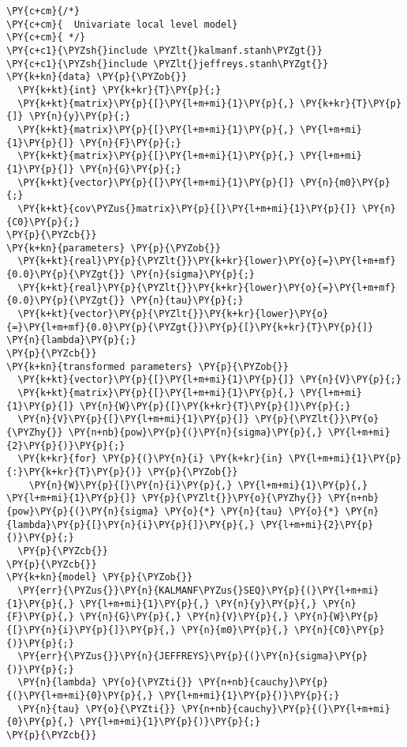 \begin{Verbatim}[commandchars=\\\{\}]
\PY{c+cm}{/*}
\PY{c+cm}{  Univariate local level model}
\PY{c+cm}{ */}
\PY{c+c1}{\PYZsh{}include \PYZlt{}kalmanf.stanh\PYZgt{}}
\PY{c+c1}{\PYZsh{}include \PYZlt{}jeffreys.stanh\PYZgt{}}
\PY{k+kn}{data} \PY{p}{\PYZob{}}
  \PY{k+kt}{int} \PY{k+kr}{T}\PY{p}{;}
  \PY{k+kt}{matrix}\PY{p}{[}\PY{l+m+mi}{1}\PY{p}{,} \PY{k+kr}{T}\PY{p}{]} \PY{n}{y}\PY{p}{;}
  \PY{k+kt}{matrix}\PY{p}{[}\PY{l+m+mi}{1}\PY{p}{,} \PY{l+m+mi}{1}\PY{p}{]} \PY{n}{F}\PY{p}{;}
  \PY{k+kt}{matrix}\PY{p}{[}\PY{l+m+mi}{1}\PY{p}{,} \PY{l+m+mi}{1}\PY{p}{]} \PY{n}{G}\PY{p}{;}
  \PY{k+kt}{vector}\PY{p}{[}\PY{l+m+mi}{1}\PY{p}{]} \PY{n}{m0}\PY{p}{;}
  \PY{k+kt}{cov\PYZus{}matrix}\PY{p}{[}\PY{l+m+mi}{1}\PY{p}{]} \PY{n}{C0}\PY{p}{;}
\PY{p}{\PYZcb{}}
\PY{k+kn}{parameters} \PY{p}{\PYZob{}}
  \PY{k+kt}{real}\PY{p}{\PYZlt{}}\PY{k+kr}{lower}\PY{o}{=}\PY{l+m+mf}{0.0}\PY{p}{\PYZgt{}} \PY{n}{sigma}\PY{p}{;}
  \PY{k+kt}{real}\PY{p}{\PYZlt{}}\PY{k+kr}{lower}\PY{o}{=}\PY{l+m+mf}{0.0}\PY{p}{\PYZgt{}} \PY{n}{tau}\PY{p}{;}
  \PY{k+kt}{vector}\PY{p}{\PYZlt{}}\PY{k+kr}{lower}\PY{o}{=}\PY{l+m+mf}{0.0}\PY{p}{\PYZgt{}}\PY{p}{[}\PY{k+kr}{T}\PY{p}{]} \PY{n}{lambda}\PY{p}{;}
\PY{p}{\PYZcb{}}
\PY{k+kn}{transformed parameters} \PY{p}{\PYZob{}}
  \PY{k+kt}{vector}\PY{p}{[}\PY{l+m+mi}{1}\PY{p}{]} \PY{n}{V}\PY{p}{;}
  \PY{k+kt}{matrix}\PY{p}{[}\PY{l+m+mi}{1}\PY{p}{,} \PY{l+m+mi}{1}\PY{p}{]} \PY{n}{W}\PY{p}{[}\PY{k+kr}{T}\PY{p}{]}\PY{p}{;}
  \PY{n}{V}\PY{p}{[}\PY{l+m+mi}{1}\PY{p}{]} \PY{p}{\PYZlt{}}\PY{o}{\PYZhy{}} \PY{n+nb}{pow}\PY{p}{(}\PY{n}{sigma}\PY{p}{,} \PY{l+m+mi}{2}\PY{p}{)}\PY{p}{;}
  \PY{k+kr}{for} \PY{p}{(}\PY{n}{i} \PY{k+kr}{in} \PY{l+m+mi}{1}\PY{p}{:}\PY{k+kr}{T}\PY{p}{)} \PY{p}{\PYZob{}}
    \PY{n}{W}\PY{p}{[}\PY{n}{i}\PY{p}{,} \PY{l+m+mi}{1}\PY{p}{,} \PY{l+m+mi}{1}\PY{p}{]} \PY{p}{\PYZlt{}}\PY{o}{\PYZhy{}} \PY{n+nb}{pow}\PY{p}{(}\PY{n}{sigma} \PY{o}{*} \PY{n}{tau} \PY{o}{*} \PY{n}{lambda}\PY{p}{[}\PY{n}{i}\PY{p}{]}\PY{p}{,} \PY{l+m+mi}{2}\PY{p}{)}\PY{p}{;}
  \PY{p}{\PYZcb{}}
\PY{p}{\PYZcb{}}
\PY{k+kn}{model} \PY{p}{\PYZob{}}
  \PY{err}{\PYZus{}}\PY{n}{KALMANF\PYZus{}SEQ}\PY{p}{(}\PY{l+m+mi}{1}\PY{p}{,} \PY{l+m+mi}{1}\PY{p}{,} \PY{n}{y}\PY{p}{,} \PY{n}{F}\PY{p}{,} \PY{n}{G}\PY{p}{,} \PY{n}{V}\PY{p}{,} \PY{n}{W}\PY{p}{[}\PY{n}{i}\PY{p}{]}\PY{p}{,} \PY{n}{m0}\PY{p}{,} \PY{n}{C0}\PY{p}{)}\PY{p}{;}
  \PY{err}{\PYZus{}}\PY{n}{JEFFREYS}\PY{p}{(}\PY{n}{sigma}\PY{p}{)}\PY{p}{;}
  \PY{n}{lambda} \PY{o}{\PYZti{}} \PY{n+nb}{cauchy}\PY{p}{(}\PY{l+m+mi}{0}\PY{p}{,} \PY{l+m+mi}{1}\PY{p}{)}\PY{p}{;}
  \PY{n}{tau} \PY{o}{\PYZti{}} \PY{n+nb}{cauchy}\PY{p}{(}\PY{l+m+mi}{0}\PY{p}{,} \PY{l+m+mi}{1}\PY{p}{)}\PY{p}{;}
\PY{p}{\PYZcb{}}
\end{Verbatim}
